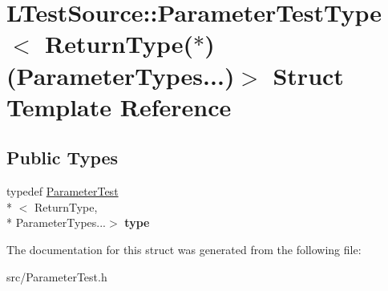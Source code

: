 \hypertarget{struct_l_test_source_1_1_parameter_test_type_3_01_return_type_07_5_08_07_parameter_types_8_8_8_08_4}{\section{L\-Test\-Source\-:\-:Parameter\-Test\-Type$<$ Return\-Type($\ast$)(Parameter\-Types...)$>$ Struct Template Reference}
\label{struct_l_test_source_1_1_parameter_test_type_3_01_return_type_07_5_08_07_parameter_types_8_8_8_08_4}
}
\subsection*{Public Types}
\begin{DoxyCompactItemize}
\item 
\hypertarget{struct_l_test_source_1_1_parameter_test_type_3_01_return_type_07_5_08_07_parameter_types_8_8_8_08_4_a28861a6b1e35769aee2b5862c570175a}{typedef \hyperlink{class_l_test_source_1_1_parameter_test}{Parameter\-Test}\\*
$<$ Return\-Type, \\*
Parameter\-Types...$>$ {\bfseries type}}\label{struct_l_test_source_1_1_parameter_test_type_3_01_return_type_07_5_08_07_parameter_types_8_8_8_08_4_a28861a6b1e35769aee2b5862c570175a}

\end{DoxyCompactItemize}


The documentation for this struct was generated from the following file\-:\begin{DoxyCompactItemize}
\item 
src/Parameter\-Test.\-h\end{DoxyCompactItemize}
